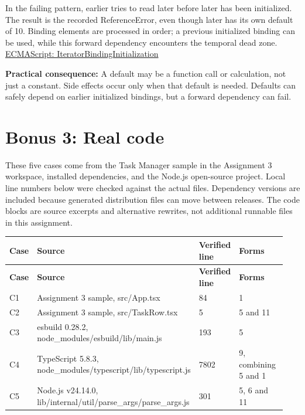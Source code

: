 \documentclass[10pt,a4paper]{article}
\begin{document}
In the failing pattern, earlier tries to read later before later has been initialized. The result is the recorded ReferenceError, even though later has its own default of 10. Binding elements are processed in order; a previous initialized binding can be used, while this forward dependency encounters the temporal dead zone. \href{https://tc39.es/ecma262/multipage/syntax-directed-operations.html\#sec-runtime-semantics-iteratorbindinginitialization}{ECMAScript: IteratorBindingInitialization}

\textbf{Practical consequence:} A default may be a function call or calculation, not just a constant. Side effects occur only when that default is needed. Defaults can safely depend on earlier initialized bindings, but a forward dependency can fail.

\section{Bonus 3: Real code}

These five cases come from the Task Manager sample in the Assignment 3 workspace, installed dependencies, and the Node.js open-source project. Local line numbers below were checked against the actual files. Dependency versions are included because generated distribution files can move between releases. The code blocks are source excerpts and alternative rewrites, not additional runnable files in this assignment.

\begingroup\footnotesize\setlength{\tabcolsep}{3pt}
\renewcommand{\arraystretch}{1.25}
\begin{longtable}{@{}L{0.070\linewidth}L{0.560\linewidth}L{0.130\linewidth}L{0.180\linewidth}@{}}
\toprule
\textbf{Case} & \textbf{Source} & \textbf{Verified line} & \textbf{Forms} \\
\midrule\endfirsthead
\toprule
\textbf{Case} & \textbf{Source} & \textbf{Verified line} & \textbf{Forms} \\
\midrule\endhead
\bottomrule\endfoot
C1 & Assignment 3 sample, src/App.tsx & 84 & 1 \\[3pt]
C2 & Assignment 3 sample, src/TaskRow.tsx & 5 & 5 and 11 \\[3pt]
C3 & esbuild 0.28.2, node\_modules/esbuild/lib/main.js & 193 & 5 \\[3pt]
C4 & TypeScript 5.8.3, node\_modules/typescript/lib/typescript.js & 7802 & 9, combining 5 and 1 \\[3pt]
C5 & Node.js v24.14.0, lib/internal/util/parse\_args/parse\_args.js & 301 & 5, 6 and 11 \\[3pt]
\end{longtable}
\endgroup
\end{document}
